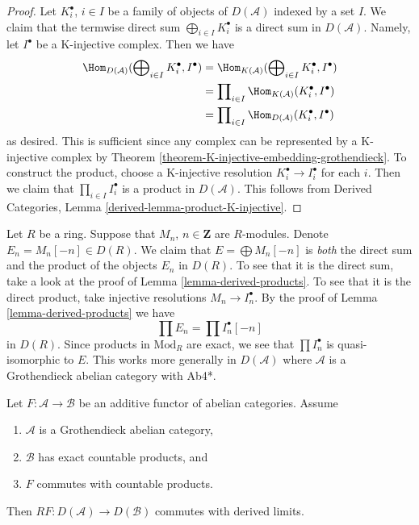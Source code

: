 \begin{proof}
Let $K^\bullet_i$, $i \in I$ be a family of objects of $D(\mathcal{A})$
indexed by a set $I$. We claim that the termwise direct sum
$\bigoplus_{i \in I} K^\bullet_i$ is a direct sum in $D(\mathcal{A})$.
Namely, let $I^\bullet$ be a K-injective complex. Then we have
\begin{align*}
\Hom_{D(\mathcal{A})}(\bigoplus\nolimits_{i \in I} K^\bullet_i, I^\bullet)
& =
\Hom_{K(\mathcal{A})}(\bigoplus\nolimits_{i \in I} K^\bullet_i, I^\bullet) \\
& =
\prod\nolimits_{i \in I} \Hom_{K(\mathcal{A})}(K^\bullet_i, I^\bullet) \\
& =
\prod\nolimits_{i \in I} \Hom_{D(\mathcal{A})}(K^\bullet_i, I^\bullet)
\end{align*}
as desired. This is sufficient since any complex can be represented
by a K-injective complex by
Theorem \ref{theorem-K-injective-embedding-grothendieck}.
To construct the product, choose a K-injective resolution
$K_i^\bullet \to I_i^\bullet$ for each $i$. Then we claim that
$\prod_{i \in I} I_i^\bullet$ is a product in $D(\mathcal{A})$.
This follows from
Derived Categories, Lemma \ref{derived-lemma-product-K-injective}.
\end{proof}

\begin{remark}
\label{remark-direct-sum-product-derived}
Let $R$ be a ring. Suppose that $M_n$, $n \in \mathbf{Z}$ are $R$-modules.
Denote $E_n = M_n[-n] \in D(R)$. We claim that $E = \bigoplus M_n[-n]$ is
{\it both} the direct sum and the product of the objects $E_n$ in $D(R)$.
To see that it is the direct sum, take a look at the proof of
Lemma \ref{lemma-derived-products}.
To see that it is the direct product, take injective resolutions
$M_n \to I_n^\bullet$. By the proof of
Lemma \ref{lemma-derived-products}
we have
$$
\prod E_n = \prod I_n^\bullet[-n]
$$
in $D(R)$. Since products in $\text{Mod}_R$ are exact, we see that
$\prod I_n^\bullet$ is quasi-isomorphic to $E$. This works more generally
in $D(\mathcal{A})$ where $\mathcal{A}$ is a Grothendieck abelian
category with Ab4*.
\end{remark}

\begin{lemma}
\label{lemma-RF-commutes-with-Rlim}
Let $F : \mathcal{A} \to \mathcal{B}$ be an additive functor of
abelian categories. Assume
\begin{enumerate}
\item $\mathcal{A}$ is a Grothendieck abelian category,
\item $\mathcal{B}$ has exact countable products, and
\item $F$ commutes with countable products.
\end{enumerate}
Then
$RF : D(\mathcal{A}) \to D(\mathcal{B})$ commutes with derived limits.
\end{lemma}

